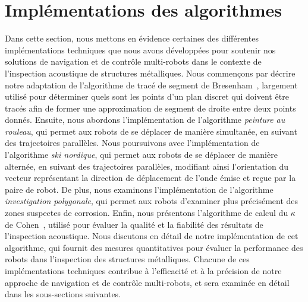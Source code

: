 \documentclass[english,RandD]{rapportPFE}  %
\begin{document}
	\section{Implémentations des algorithmes}
		Dans cette section, nous mettons en évidence certaines des différentes implémentations techniques que nous avons développées pour soutenir nos solutions de navigation et de contrôle multi-robots dans le contexte de l'inspection acoustique de structures métalliques.
		Nous commençons par décrire notre adaptation de l'algorithme de tracé de segment de Bresenham~\cite{enwiki:1155124335}, largement utilisé pour déterminer quels sont les points d'un plan discret qui doivent être tracés afin de former une approximation de segment de droite entre deux points donnés.
		Ensuite, nous abordons l'implémentation de l'algorithme \textit{peinture au rouleau}, qui permet aux robots de se déplacer de manière simultanée, en suivant des trajectoires parallèles.
		Nous poursuivons avec l'implémentation de l'algorithme \textit{ski nordique}, qui permet aux robots de se déplacer de manière alternée, en suivant des trajectoires parallèles, modifiant ainsi l'orientation du vecteur représentant la direction de déplacement de l'onde émise et reçue par la paire de robot.
		De plus, nous examinons l'implémentation de l'algorithme \textit{investigation polygonale}, qui permet aux robots d'examiner plus précisément des zones suspectes de corrosion.
		Enfin, nous présentons l'algorithme de calcul du $\kappa$ de Cohen~\cite{enwiki:1130024730}, utilisé pour évaluer la qualité et la fiabilité des résultats de l'inspection acoustique.
		Nous discutons en détail de notre implémentation de cet algorithme, qui fournit des mesures quantitatives pour évaluer la performance des robots dans l'inspection des structures métalliques.
		Chacune de ces implémentations techniques contribue à l'efficacité et à la précision de notre approche de navigation et de contrôle multi-robots, et sera examinée en détail dans les sous-sections suivantes.
\end{document}
